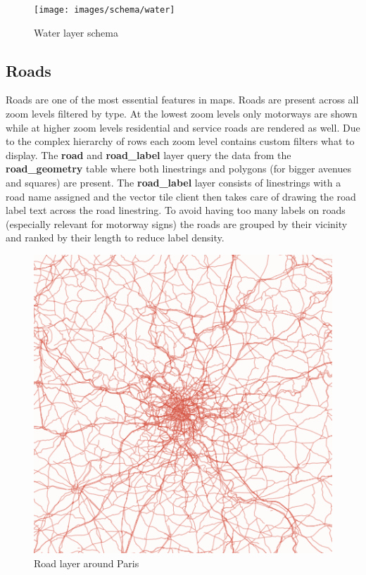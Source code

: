 \begin{figure}[H]
  \centering
  \texttt{[image: images/schema/water]}
  \caption{Water layer schema}
\end{figure}
    

\subsection{Roads}

\noindent\begin{minipage}[t]{0.48\linewidth}
    \vspace{0pt}
    Roads are one of the most essential features in maps. Roads are present across all zoom levels filtered by type. At the lowest zoom levels only motorways are shown while at higher zoom levels residential and service roads are rendered as well. Due to the complex hierarchy of rows each zoom level contains custom filters what to display. The \textbf{road} and \textbf{road\_label} layer query the data from the \textbf{road\_geometry} table where both linestrings and polygons (for bigger avenues and squares) are present.
    The \textbf{road\_label} layer consists of linestrings with a road name assigned and the vector tile client then takes care of drawing the road label text across the road linestring. To avoid having too many labels on roads (especially relevant for motorway signs) the roads are grouped by their vicinity and ranked by their length to reduce label density.
\end{minipage}
\hfill
\begin{minipage}[t]{0.48\linewidth}
    \vspace{-10pt}
    \begin{figure}[H]
      \includegraphics[width=1\textwidth]{images/schema/road_example}
      \caption{Road layer around Paris}
    \end{figure}
\end{minipage}

